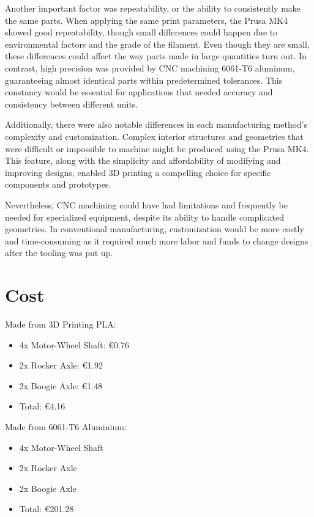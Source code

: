     Another important factor was repeatability, or the ability to consistently make the same parts. When
    applying the same print parameters, the Prusa MK4 showed good repeatability, though small differences
    could happen due to environmental factors and the grade of the filament. Even though they are small,
    these differences could affect the way parts made in large quantities turn out. In contrast, high precision
    was provided by CNC machining 6061-T6 aluminum, guaranteeing almost identical parts within
    predetermined tolerances. This constancy would be essential for applications that needed accuracy and
    consistency between different units.

    Additionally, there were also notable differences in each manufacturing method's complexity and
    customization. Complex interior structures and geometries that were difficult or impossible to machine
    might be produced using the Prusa MK4. This feature, along with the simplicity and affordability of modifying
    and improving designs, enabled 3D printing a compelling choice for specific components and prototypes.

    Nevertheless, CNC machining could have had limitations and frequently be needed for specialized
    equipment, despite its ability to handle complicated geometries. In conventional manufacturing,
    customization would be more costly and time-consuming as it required much more labor and funds to
    change designs after the tooling was put up.
    \newpage

\section{Cost}

    Made from 3D Printing PLA:
    \begin{itemize}
        \item 4x Motor-Wheel Shaft: €0.76
        \item 2x Rocker Axle: €1.92
        \item 2x Boogie Axle: €1.48
        \item Total: €4.16
    \end{itemize}

    Made from 6061-T6 Aluminium:

    \begin{itemize}
        \item 4x Motor-Wheel Shaft
        \item 2x Rocker Axle
        \item 2x Boogie Axle
        \item Total: €201.28    
    \end{itemize}

